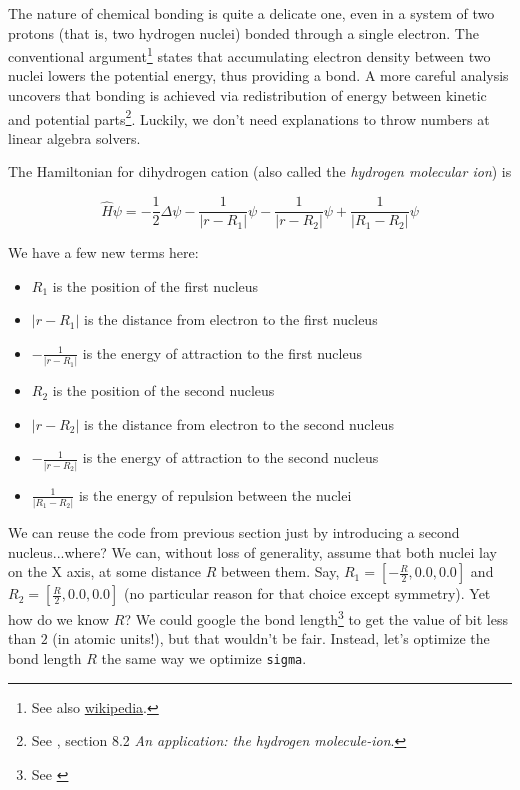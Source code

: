 \documentclass{article}
\begin{document}
The nature of chemical bonding is quite a delicate one, even in a system of two protons (that is, two hydrogen nuclei) bonded through a single electron. The conventional argument\footnote{See also \href{https://en.wikipedia.org/wiki/Dihydrogen_cation}{wikipedia}.} states that accumulating electron density between two nuclei lowers the potential energy, thus providing a bond. A more careful analysis uncovers that bonding is achieved via redistribution of energy between kinetic and potential parts\footnote{See \cite{ref:atkins}, section 8.2 \textit{An application: the hydrogen molecule-ion}.}. Luckily, we don't need explanations to throw numbers at linear algebra solvers.

The Hamiltonian for dihydrogen cation (also called the \textit{hydrogen molecular ion}) is

\begin{equation}
\hat H\psi = -\frac{1}{2} \Delta \psi - \frac{1}{|r-R_1|}\psi - \frac{1}{|r-R_2|}\psi + \frac{1}{|R_1-R_2|}\psi
\end{equation}

We have a few new terms here:

\begin{itemize}
\item \(R_1\) is the position of the first nucleus
\item \(|r-R_1|\) is the distance from electron to the first nucleus
\item \(-\frac{1}{|r-R_1|}\) is the energy of attraction to the first nucleus
\item \(R_2\) is the position of the second nucleus
\item \(|r-R_2|\) is the distance from electron to the second nucleus
\item \(-\frac{1}{|r-R_2|}\) is the energy of attraction to the second nucleus
\item \(\frac{1}{|R_1-R_2|}\) is the energy of repulsion between the nuclei
\end{itemize}

We can reuse the code from previous section just by introducing a second nucleus...where? We can, without loss of generality, assume that both nuclei lay on the X axis, at some distance \(R\) between them. Say, \(R_1 = [-\frac{R}{2}, 0.0, 0.0]\) and \(R_2 = [\frac{R}{2}, 0.0, 0.0]\) (no particular reason for that choice except symmetry). Yet how do we know \(R\)? We could google the bond length\footnote{See \cite{ref:dihydrogen}} to get the value of bit less than \(2\) (in atomic units!), but that wouldn't be fair. Instead, let's optimize the bond length \(R\) the same way we optimize \texttt{sigma}.
\end{document}
